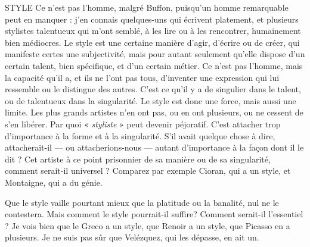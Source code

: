STYLE Ce n’est pas l’homme, malgré Buffon, puisqu’un homme remarquable
peut en manquer : j'en connais quelques-uns qui écrivent
platement, et plusieurs stylistes talentueux qui m'ont semblé, à les lire ou à
les rencontrer, humainement bien médiocres. Le style est une certaine
manière d’agir, d'écrire ou de créer, qui manifeste certes une subjectivité,
mais pour autant seulement qu’elle dispose d’un certain talent, bien spécifique,
et d’un certain métier. Ce n’est pas l’homme, mais la capacité qu’il a,
et ils ne l’ont pas tous, d’inventer une expression qui lui ressemble ou le distingue
des autres. C’est ce qu’il y a de singulier dans le talent, ou de talentueux
dans la singularité. Le style est donc une force, mais aussi une limite.
Les plus grands artistes n’en ont pas, ou en ont plusieurs, ou ne cessent de
s’en libérer. Par quoi « {\it styliste} » peut devenir péjoratif. C’est attacher trop
d'importance à la forme et à la singularité. S’il avait quelque chose à dire,
attacherait-il — ou attacherions-nous — autant d'importance à la façon dont il
le dit ? Cet artiste à ce point prisonnier de sa manière ou de sa singularité,
comment serait-il universel ? Comparez par exemple Cioran, qui a un style, et
Montaigne, qui a du génie.

Que le style vaille pourtant mieux que la platitude ou la banalité, nul ne le
contestera. Mais comment le style pourrait-il suffire? Comment serait-il
l'essentiel ? Je vois bien que le Greco a un style, que Renoir a un style, que Picasso
en a plusieurs. Je ne suis pas sûr que Velézquez, qui les dépasse, en ait un.

